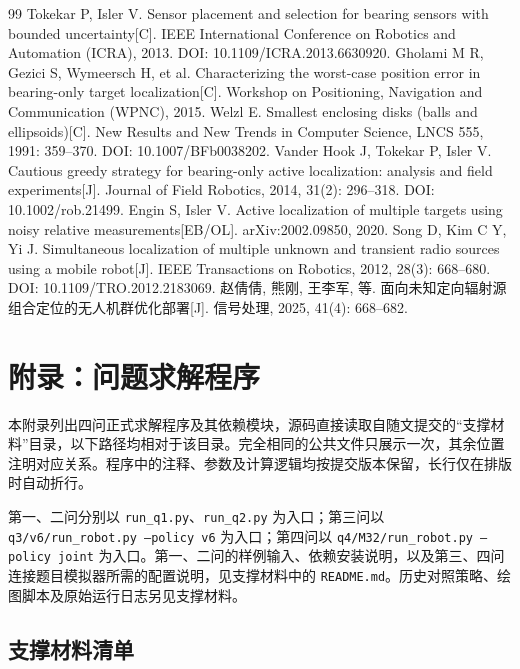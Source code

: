 \documentclass[UTF8,a4paper,zihao=-4,fontset=none]{ctexart}
\begin{document}
\clearpage
\begin{thebibliography}{99}
   Tokekar P, Isler V. Sensor placement and selection for bearing sensors with bounded uncertainty[C]. IEEE International Conference on Robotics and Automation (ICRA), 2013. DOI: 10.1109/ICRA.2013.6630920.
   Gholami M R, Gezici S, Wymeersch H, et al. Characterizing the worst-case position error in bearing-only target localization[C]. Workshop on Positioning, Navigation and Communication (WPNC), 2015.
   Welzl E. Smallest enclosing disks (balls and ellipsoids)[C]. New Results and New Trends in Computer Science, LNCS 555, 1991: 359--370. DOI: 10.1007/BFb0038202.
   Vander Hook J, Tokekar P, Isler V. Cautious greedy strategy for bearing-only active localization: analysis and field experiments[J]. Journal of Field Robotics, 2014, 31(2): 296--318. DOI: 10.1002/rob.21499.
   Engin S, Isler V. Active localization of multiple targets using noisy relative measurements[EB/OL]. arXiv:2002.09850, 2020.
   Song D, Kim C Y, Yi J. Simultaneous localization of multiple unknown and transient radio sources using a mobile robot[J]. IEEE Transactions on Robotics, 2012, 28(3): 668--680. DOI: 10.1109/TRO.2012.2183069.
   赵倩倩, 熊刚, 王李军, 等. 面向未知定向辐射源组合定位的无人机群优化部署[J]. 信号处理, 2025, 41(4): 668--682.
\end{thebibliography}

\clearpage
\section{附录：问题求解程序}
\label{sec:program-appendix}
本附录列出四问正式求解程序及其依赖模块，源码直接读取自随文提交的“支撑材料”目录，以下路径均相对于该目录。完全相同的公共文件只展示一次，其余位置注明对应关系。程序中的注释、参数及计算逻辑均按提交版本保留，长行仅在排版时自动折行。

第一、二问分别以 \texttt{run\_q1.py}、\texttt{run\_q2.py} 为入口；第三问以 \texttt{q3/v6/run\_robot.py --policy v6} 为入口；第四问以 \texttt{q4/M32/run\_robot.py --policy joint} 为入口。第一、二问的样例输入、依赖安装说明，以及第三、四问连接题目模拟器所需的配置说明，见支撑材料中的 \texttt{README.md}。历史对照策略、绘图脚本及原始运行日志另见支撑材料。
\subsection{支撑材料清单}
\end{document}
